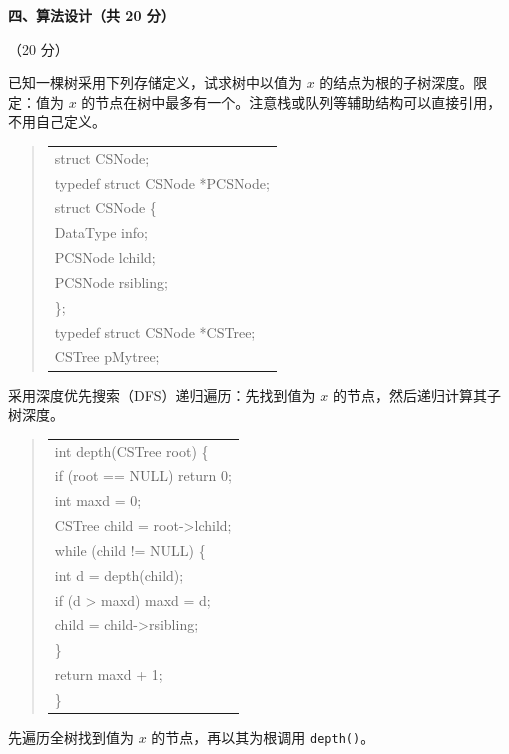 \clearpage

\textbf{四、算法设计（共 20 分）}

\begin{question}[求子树深度]（20 分）

已知一棵树采用下列存储定义，试求树中以值为 $x$ 的结点为根的子树深度。限定：值为 $x$ 的节点在树中最多有一个。注意栈或队列等辅助结构可以直接引用，不用自己定义。

\begin{quote}
\footnotesize
\begin{tabular}{@{}l@{}}
struct CSNode;\\
typedef struct CSNode *PCSNode;\\
struct CSNode \{\\
    DataType info;\\
    PCSNode lchild;\\
    PCSNode rsibling;\\
\};\\
typedef struct CSNode *CSTree;\\
CSTree pMytree;\\
\end{tabular}
\end{quote}

\begin{solution}
采用深度优先搜索（DFS）递归遍历：先找到值为 $x$ 的节点，然后递归计算其子树深度。
\begin{quote}
\footnotesize
\begin{tabular}{@{}l@{}}
int depth(CSTree root) \{\\
    if (root == NULL) return 0;\\
    int maxd = 0;\\
    CSTree child = root->lchild;\\
    while (child != NULL) \{\\
        int d = depth(child);\\
        if (d > maxd) maxd = d;\\
        child = child->rsibling;\\
    \}\\
    return maxd + 1;\\
\}\\
\end{tabular}
\end{quote}
先遍历全树找到值为 $x$ 的节点，再以其为根调用 \texttt{depth()}。
\end{solution}
\end{question}

\clearpage
